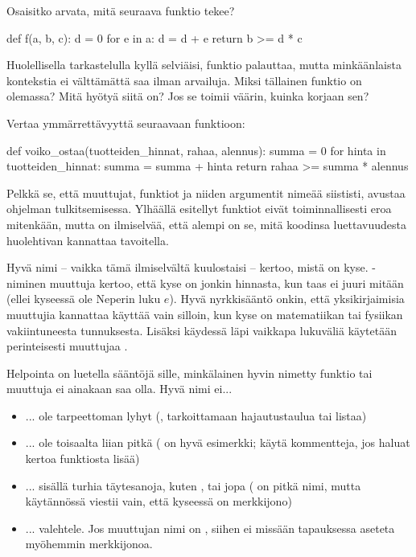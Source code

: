 Osaisitko arvata, mitä seuraava funktio tekee?

\begin{python}
def f(a, b, c):
       d = 0
       for e in a:
              d = d + e
       return b >= d * c
\end{python}

Huolellisella tarkastelulla kyllä selviäisi,  funktio palauttaa, mutta minkäänlaista kontekstia ei välttämättä saa ilman arvailuja. Miksi tällainen funktio on olemassa? Mitä hyötyä siitä on? Jos se toimii väärin, kuinka korjaan sen?

Vertaa ymmärrettävyyttä seuraavaan funktioon:

\begin{python}
def voiko_ostaa(tuotteiden_hinnat, rahaa, alennus):
       summa = 0
       for hinta in tuotteiden_hinnat:
              summa = summa + hinta
       return rahaa >= summa * alennus
\end{python}

Pelkkä se, että muuttujat, funktiot ja niiden argumentit nimeää siististi, avustaa ohjelman tulkitsemisessa. Ylhäällä esitellyt funktiot eivät toiminnallisesti eroa mitenkään, mutta on ilmiselvää, että alempi on se, mitä koodinsa luettavuudesta huolehtivan kannattaa tavoitella.

Hyvä nimi -- vaikka tämä ilmiselvältä kuulostaisi -- kertoo, mistä on kyse. -niminen muuttuja kertoo, että kyse on jonkin hinnasta, kun taas  ei juuri mitään (ellei kyseessä ole Neperin luku $e$). Hyvä nyrkkisääntö onkin, että yksikirjaimisia muuttujia kannattaa käyttää vain silloin, kun kyse on matematiikan tai fysiikan vakiintuneesta tunnuksesta. Lisäksi käydessä läpi vaikkapa lukuväliä käytetään perinteisesti muuttujaa .

Helpointa on luetella sääntöjä sille, minkälainen hyvin nimetty funktio tai muuttuja ei ainakaan saa olla. Hyvä nimi ei...

\begin{itemize}
\item ... ole tarpeettoman lyhyt (,  tarkoittamaan hajautustaulua tai  listaa)
\item ... ole toisaalta liian pitkä ( on hyvä esimerkki; käytä kommentteja, jos haluat kertoa funktiosta lisää)
\item ... sisällä turhia täytesanoja, kuten ,  tai jopa  ( on pitkä nimi, mutta käytännössä viestii vain, että kyseessä on merkkijono)
\item ... valehtele. Jos muuttujan nimi on , siihen ei missään tapauksessa aseteta myöhemmin merkkijonoa.
\end{itemize}

